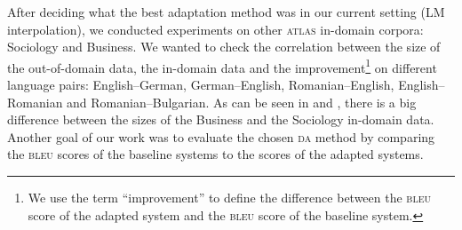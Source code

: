 \documentclass[output=paper]{LSP/langsci}
\begin{document}
\begin{table}
\caption{Results of experiments on Business in-domain data}
\label{tab:dumavertan:5}
\end{table}

After deciding what the best adaptation method was in our current setting (\textsc{LM} interpolation), we conducted experiments on other \textsc{atlas} in-domain corpora: Sociology and Business. We wanted to check the correlation between the size of the out-of-domain data, the in-domain data and the improvement\footnote{We use the term ``improvement'' to define the difference between the \textsc{bleu} score of the adapted system and the \textsc{bleu} score of the baseline system.} on different language pairs: English--German, German--English, Romanian--English, English--Romanian and Romanian--Bulgarian. As can be seen in  and , there is a big difference between the sizes of the Business and the Sociology in-domain data. Another goal of our work was to evaluate the chosen \textsc{da} method by comparing the \textsc{bleu} scores of the baseline systems to the scores of the adapted systems.
\end{document}
